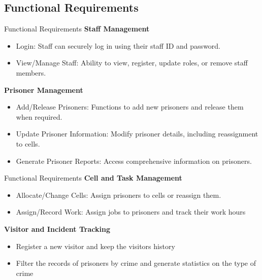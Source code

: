 \documentclass[aspectratio=169]{beamer}
\begin{document}
\subsection{Functional Requirements}
\begin{frame}{Functional Requirements}
    \textbf{Staff Management}
    \begin{itemize}
        \item Login: Staff can securely log in using their staff ID and password.
        \item View/Manage Staff: Ability to view, register, update roles, or remove staff members.
    \end{itemize}
    \textbf{Prisoner Management}
    \begin{itemize}
        \item Add/Release Prisoners: Functions to add new prisoners and release them when required.
        \item Update Prisoner Information: Modify prisoner details, including reassignment to cells.
        \item Generate Prisoner Reports: Access comprehensive information on prisoners.
    \end{itemize}   
    
\end{frame}
\begin{frame}{Functional Requirements}
    \textbf{Cell and Task Management}
    \begin{itemize}
        \item Allocate/Change Cells: Assign prisoners to cells or reassign them.
        \item Assign/Record Work: Assign jobs to prisoners and track their work hours

    \end{itemize}
    \textbf{Visitor and Incident Tracking}
    \begin{itemize}
        \item  Register a new visitor and keep the visitors history
        \item Filter the records of prisoners by crime and generate statistics on the type of crime
    \end{itemize}
    
\end{frame}
\end{document}
